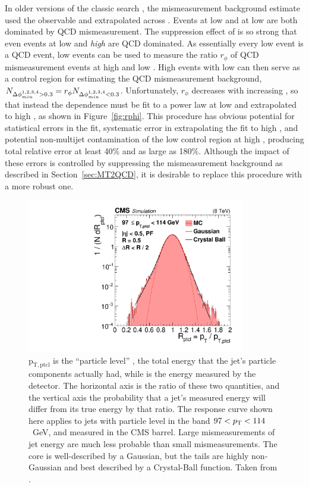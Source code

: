     In older versions of the classic search \cite{MT2_2015, MT2_2016}, the mismeasurement background estimate used the \dphimin observable and extrapolated across \mttwo.
    Events at low \mttwo and at low \dphimin are both dominated by QCD mismeasurement.
    The suppression effect of \mttwo is so strong that even events at low \mttwo and {\it high} \dphimin are QCD dominated.
    As essentially every low \mttwo event is a QCD event, low \mttwo events can be used to measure the ratio $r_{\phi}$ of QCD mismeasurement events at high and low \dphimin.
    High \mttwo events with low \dphimin can then serve as a control region for estimating the QCD mismeasurement background, $N_{\Delta\phi_{min}^{1,2,3,4} > 0.3} = r_{\phi} N_{\Delta\phi_{min}^{1,2,3,4} < 0.3}$.
    Unfortunately, $r_{\phi}$ decreases with increasing \mttwo, so that instead the dependence must be fit to a power law at low \mttwo and extrapolated to high \mttwo, as shown in Figure~\ref{fig:rphi}.
    This procedure has obvious potential for statistical errors in the fit, systematic error in extrapolating the fit to high \mttwo, and potential non-multijet contamination of the low \dphimin control region at high \mttwo, producing total relative error at least 40\% and as large as 180\%.
    Although the impact of these errors is controlled by suppressing the mismeasurement background as described in Section~\ref{sec:MT2QCD}, it is desirable to replace this procedure with a more robust one.

    \begin{figure}[h!]
      \centering
      \includegraphics[width=0.85\textwidth]{figures/jet_resolution.pdf}
      \caption[Example plot of jet energy resolution template.]{
        $\mathrm{p}_{\mathrm{T,ptcl}}$ is the ``particle level'' \pt, the total energy that the jet's particle components actually had, while \pt is the energy measured by the detector.
        The horizontal axis is the ratio of these two quantities, and the vertical axis the probability that a jet's measured energy will differ from its true energy by that ratio.
        The response curve shown here applies to jets with particle level \pt in the band $97 < p_{\mathrm{T}} < 114$~GeV, and measured in the CMS barrel.
        Large mismeasurements of jet energy are much less probable than small mismeasurements.
        The core is well-described by a Gaussian, but the tails are highly non-Gaussian and best described by a Crystal-Ball function.
        Taken from \cite{jet_resolution}.}
      \label{fig:jet_resolution}
    \end{figure}  


